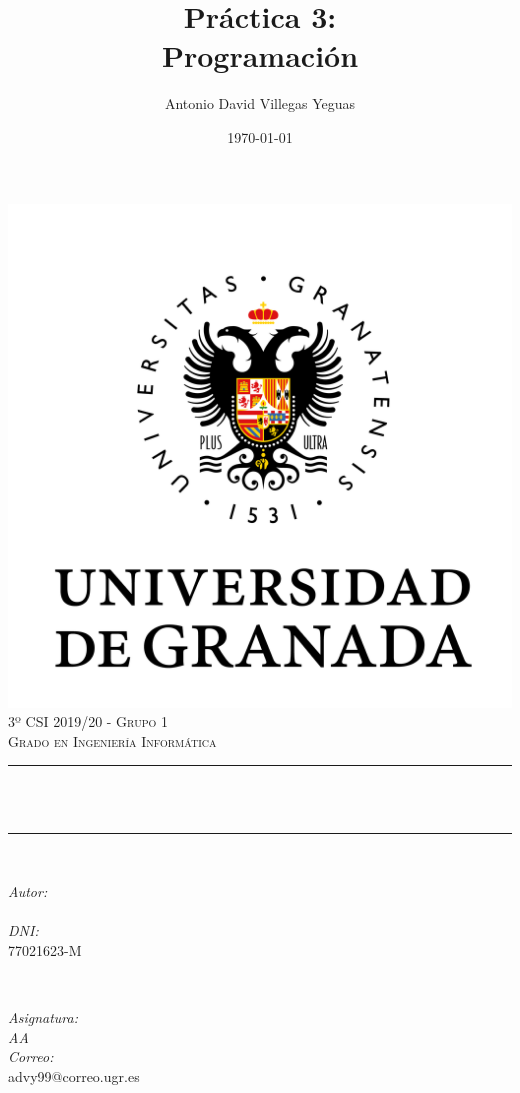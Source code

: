 \documentclass[12pt, spanish]{article}
\title{Práctica 3:\\
Programación  \hspace{0.05cm} }
\author{Antonio David Villegas Yeguas}
\date{\today}
\makeatletter
\let\thetitle\@title
\let\theauthor\@author
\makeatother
\begin{document}

\begin{titlepage}
    \centering
    \vspace*{0.3 cm}
    \includegraphics[scale = 0.50]{ugr.png}\\[0.7 cm]
    \textsc{\large 3º CSI 2019/20 - Grupo 1}\\[0.5 cm]            
    \textsc{\large Grado en Ingeniería Informática}\\[0.5 cm]              
    \rule{\linewidth}{0.2 mm} \\[0.2 cm]
    { \huge \bfseries \thetitle}\\
    \rule{\linewidth}{0.2 mm} \\[1 cm]
    
    \begin{minipage}{0.4\textwidth}
        \begin{flushleft} \large
            \emph{Autor:}\\
            \theauthor\\ 
			 \emph{DNI:}\\
            77021623-M
            \end{flushleft}
            \end{minipage}~
            \begin{minipage}{0.4\textwidth}
            \begin{flushright} \large
            \emph{Asignatura: \\
            AA}   \\     
            \emph{Correo:}\\
            advy99@correo.ugr.es           
        \end{flushright}
    \end{minipage}\\[0.5cm]
  

\end{titlepage}
\end{document}

